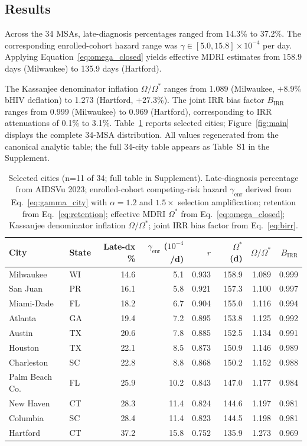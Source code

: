 \documentclass[11pt]{article}
\begin{document}
\subsection{Results}

Across the 34 MSAs, late-diagnosis percentages ranged from 14.3\% to 37.2\%. The corresponding enrolled-cohort hazard range was $\gamma \in [5.0, 15.8] \times 10^{-4}$ per day. Applying Equation~\ref{eq:omega_closed} yields effective MDRI estimates from 158.9 days (Milwaukee) to 135.9 days (Hartford).

The Kassanjee denominator inflation $\Omega/\Omega^*$ ranges from 1.089 (Milwaukee, $+8.9\%$ bHIV deflation) to 1.273 (Hartford, $+27.3\%$). The joint IRR bias factor $B_{\mathrm{IRR}}$ ranges from 0.999 (Milwaukee) to 0.969 (Hartford), corresponding to IRR attenuations of 0.1\% to 3.1\%. Table~\ref{tab:selected_cities} reports selected cities; Figure~\ref{fig:main} displays the complete 34-MSA distribution. All values regenerated from the canonical analytic table; the full 34-city table appears as Table~S1 in the Supplement.
\begin{table}[ht]
\centering
\small
\caption{Selected cities (n=11 of 34; full table in Supplement). Late-diagnosis percentage from AIDSVu 2023; enrolled-cohort competing-risk hazard $\gamma_{\mathrm{enr}}$ derived from Eq.~\ref{eq:gamma_city} with $\alpha=1.2$ and $1.5\times$ selection amplification; retention from Eq.~\ref{eq:retention}; effective MDRI $\Omega^*$ from Eq.~\ref{eq:omega_closed}; Kassanjee denominator inflation $\Omega/\Omega^*$; joint IRR bias factor from Eq.~\ref{eq:birr}.}
\label{tab:selected_cities}
\begin{tabular}{llrrrrrr}
\toprule
City & State & Late-dx \% & $\gamma_{\mathrm{enr}}$ ($10^{-4}$/d) & $r$ & $\Omega^*$ (d) & $\Omega/\Omega^*$ & $B_{\mathrm{IRR}}$ \\
\midrule
Milwaukee & WI & 14.6 & 5.1 & 0.933 & 158.9 & 1.089 & 0.999 \\
San Juan & PR & 16.1 & 5.8 & 0.921 & 157.3 & 1.100 & 0.997 \\
Miami-Dade & FL & 18.2 & 6.7 & 0.904 & 155.0 & 1.116 & 0.994 \\
Atlanta & GA & 19.4 & 7.2 & 0.895 & 153.8 & 1.125 & 0.992 \\
Austin & TX & 20.6 & 7.8 & 0.885 & 152.5 & 1.134 & 0.991 \\
Houston & TX & 22.1 & 8.5 & 0.873 & 150.9 & 1.146 & 0.989 \\
Charleston & SC & 22.8 & 8.8 & 0.868 & 150.2 & 1.152 & 0.988 \\
Palm Beach Co. & FL & 25.9 & 10.2 & 0.843 & 147.0 & 1.177 & 0.984 \\
New Haven & CT & 28.3 & 11.4 & 0.824 & 144.6 & 1.197 & 0.981 \\
Columbia & SC & 28.4 & 11.4 & 0.823 & 144.5 & 1.198 & 0.981 \\
Hartford & CT & 37.2 & 15.8 & 0.752 & 135.9 & 1.273 & 0.969 \\
\bottomrule
\end{tabular}
\end{table}
\end{document}
